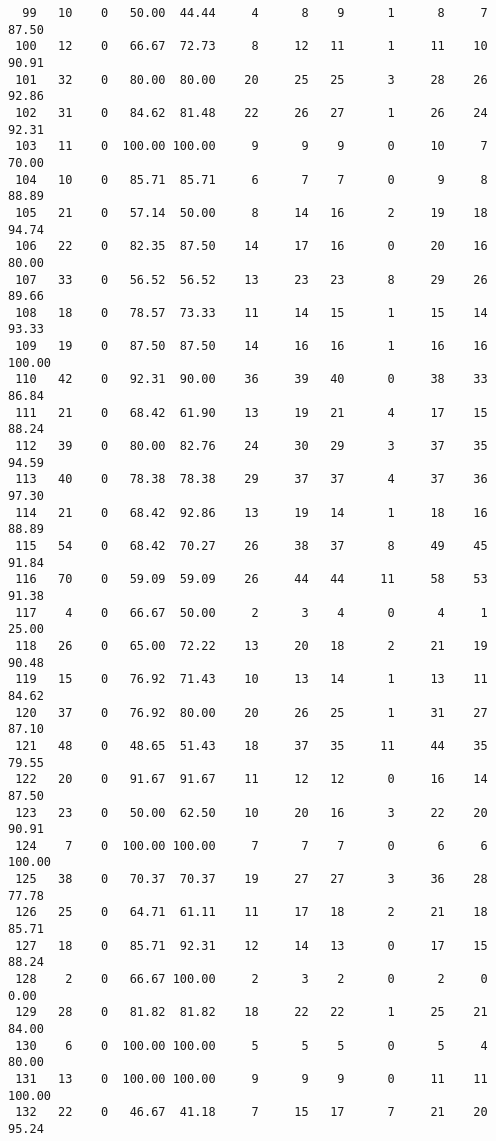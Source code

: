 \begin{verbatim}
  99   10    0   50.00  44.44     4      8    9      1      8     7    87.50
 100   12    0   66.67  72.73     8     12   11      1     11    10    90.91
 101   32    0   80.00  80.00    20     25   25      3     28    26    92.86
 102   31    0   84.62  81.48    22     26   27      1     26    24    92.31
 103   11    0  100.00 100.00     9      9    9      0     10     7    70.00
 104   10    0   85.71  85.71     6      7    7      0      9     8    88.89
 105   21    0   57.14  50.00     8     14   16      2     19    18    94.74
 106   22    0   82.35  87.50    14     17   16      0     20    16    80.00
 107   33    0   56.52  56.52    13     23   23      8     29    26    89.66
 108   18    0   78.57  73.33    11     14   15      1     15    14    93.33
 109   19    0   87.50  87.50    14     16   16      1     16    16   100.00
 110   42    0   92.31  90.00    36     39   40      0     38    33    86.84
 111   21    0   68.42  61.90    13     19   21      4     17    15    88.24
 112   39    0   80.00  82.76    24     30   29      3     37    35    94.59
 113   40    0   78.38  78.38    29     37   37      4     37    36    97.30
 114   21    0   68.42  92.86    13     19   14      1     18    16    88.89
 115   54    0   68.42  70.27    26     38   37      8     49    45    91.84
 116   70    0   59.09  59.09    26     44   44     11     58    53    91.38
 117    4    0   66.67  50.00     2      3    4      0      4     1    25.00
 118   26    0   65.00  72.22    13     20   18      2     21    19    90.48
 119   15    0   76.92  71.43    10     13   14      1     13    11    84.62
 120   37    0   76.92  80.00    20     26   25      1     31    27    87.10
 121   48    0   48.65  51.43    18     37   35     11     44    35    79.55
 122   20    0   91.67  91.67    11     12   12      0     16    14    87.50
 123   23    0   50.00  62.50    10     20   16      3     22    20    90.91
 124    7    0  100.00 100.00     7      7    7      0      6     6   100.00
 125   38    0   70.37  70.37    19     27   27      3     36    28    77.78
 126   25    0   64.71  61.11    11     17   18      2     21    18    85.71
 127   18    0   85.71  92.31    12     14   13      0     17    15    88.24
 128    2    0   66.67 100.00     2      3    2      0      2     0     0.00
 129   28    0   81.82  81.82    18     22   22      1     25    21    84.00
 130    6    0  100.00 100.00     5      5    5      0      5     4    80.00
 131   13    0  100.00 100.00     9      9    9      0     11    11   100.00
 132   22    0   46.67  41.18     7     15   17      7     21    20    95.24

\end{verbatim}
